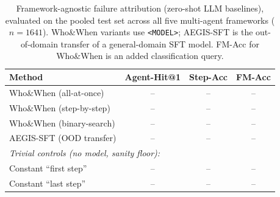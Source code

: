 %
%
%
\begin{table}[t]
\centering
\caption{Framework-agnostic failure attribution (zero-shot LLM baselines), evaluated
on the pooled test set across all five multi-agent frameworks ($n{=}1641$).
Who\&When variants use \texttt{<MODEL>}; AEGIS-SFT is the out-of-domain transfer of a
general-domain SFT model. FM-Acc for Who\&When is an added classification query.}
\label{tab:agnostic-baselines}
\begin{tabular}{lccc}
\toprule
Method & Agent-Hit@1 & Step-Acc & FM-Acc \\
\midrule
Who\&When (all-at-once)   & -- & -- & -- \\
Who\&When (step-by-step)  & -- & -- & -- \\
Who\&When (binary-search) & -- & -- & -- \\
AEGIS-SFT (OOD transfer)  & -- & -- & -- \\
\midrule
\multicolumn{4}{l}{\footnotesize\textit{Trivial controls (no model, sanity floor):}} \\
Constant ``first step''   & -- & -- & -- \\
Constant ``last step''    & -- & -- & -- \\
\bottomrule
\end{tabular}
\end{table}
